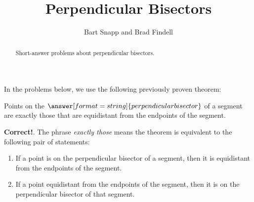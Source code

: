 \documentclass[nooutcomes]{ximera}
\title{Perpendicular Bisectors}
\author{Bart Snapp and Brad Findell}
\begin{document}
\begin{abstract}
Short-answer problems about perpendicular bisectors. 
\end{abstract}
\maketitle


\begin{problem}
In the problems below, we use the following previously proven theorem: 
\begin{theorem}
Points on the $\answer[format=string]{perpendicular bisector}$ of a segment are exactly those 
that are equidistant from the endpoints of the segment.  
\end{theorem}
\begin{feedback}[correct]
\textbf{Correct!}. The phrase \emph{exactly those} means the theorem is equivalent to the following pair of statements: 
\begin{enumerate}
\item If a point is on the perpendicular bisector of a segment, then it is equidistant from the endpoints of the segment. 
\item If a point equidistant from the endpoints of the segment, then it is on the perpendicular bisector of that segment. 
\end{enumerate}
\end{feedback}
\end{problem}
\end{document}
